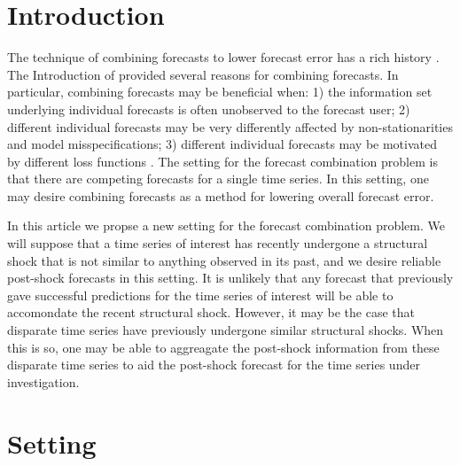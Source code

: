 \documentclass[11pt]{article}
\begin{document}
\section{Introduction}
The technique of combining forecasts to lower forecast error has a rich 
history \citep{bates1969combination, mundlak1978pooling, 
  timmermann2006forecast, granger2014forecasting}.  
The Introduction of \citet{timmermann2006forecast} provided several reasons 
for combining forecasts.  In particular, combining forecasts may be 
beneficial when: 
1) the information set underlying individual forecasts is often unobserved to 
the forecast user; 2) different individual forecasts may be very differently 
affected by non-stationarities and model misspecifications; 3) different 
individual forecasts may be motivated by different loss functions 
\citep[and references therein]{timmermann2006forecast}.
The setting for the forecast combination problem is that there are 
competing forecasts for a single time series.  In this setting, one may 
desire combining forecasts as a method for lowering overall forecast error.  




In this article we propse a new setting for the forecast combination 
problem.  We will suppose that a time series of interest has recently 
undergone a structural shock that is not similar to anything observed in its 
past, and we desire reliable post-shock forecasts in this setting.  It is 
unlikely that any forecast that previously gave successful predictions for  
the time series of interest will be able to accomondate the recent structural 
shock.  However, it may be the case that disparate time series have previously 
undergone similar structural shocks.  When this is so, one may be able to 
aggreagate the post-shock information from these disparate time series to aid 
the post-shock forecast for the time series under investigation.  



\section{Setting}
\end{document}
